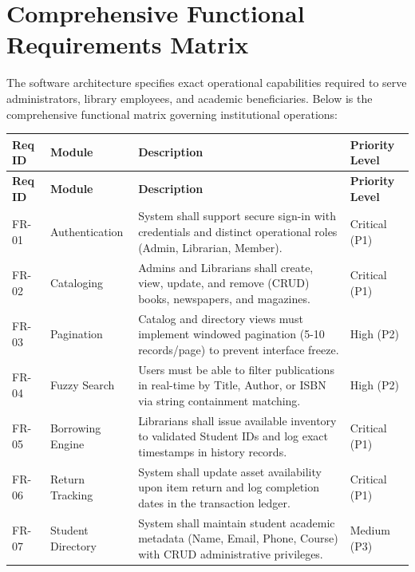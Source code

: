 \documentclass[11pt,a4paper]{report}
\begin{document}
\section{Comprehensive Functional Requirements Matrix}
The software architecture specifies exact operational capabilities required to serve administrators, library employees, and academic beneficiaries. Below is the comprehensive functional matrix governing institutional operations:

\vspace{10pt}
\noindent
\begin{center}
\renewcommand{\arraystretch}{1.25}
\begin{longtable}{|L{1.8cm}|L{2.8cm}|L{7.5cm}|L{3.0cm}|}
\hline
{}
\textbf{\color{white}Req ID} & \textbf{\color{white}Module} & \textbf{\color{white}Description} & \textbf{\color{white}Priority Level} \\
\hline
\endfirsthead
\hline
{}
\textbf{\color{white}Req ID} & \textbf{\color{white}Module} & \textbf{\color{white}Description} & \textbf{\color{white}Priority Level} \\
\hline
\endhead
FR-01 & Authentication & System shall support secure sign-in with credentials and distinct operational roles (Admin, Librarian, Member). & Critical (P1) \\
\hline
{}
FR-02 & Cataloging & Admins and Librarians shall create, view, update, and remove (CRUD) books, newspapers, and magazines. & Critical (P1) \\
\hline
FR-03 & Pagination & Catalog and directory views must implement windowed pagination (5-10 records/page) to prevent interface freeze. & High (P2) \\
\hline
{}
FR-04 & Fuzzy Search & Users must be able to filter publications in real-time by Title, Author, or ISBN via string containment matching. & High (P2) \\
\hline
FR-05 & Borrowing Engine & Librarians shall issue available inventory to validated Student IDs and log exact timestamps in history records. & Critical (P1) \\
\hline
{}
FR-06 & Return Tracking & System shall update asset availability upon item return and log completion dates in the transaction ledger. & Critical (P1) \\
\hline
FR-07 & Student Directory & System shall maintain student academic metadata (Name, Email, Phone, Course) with CRUD administrative privileges. & Medium (P3) \\

\end{longtable}
\end{center}
\end{document}
